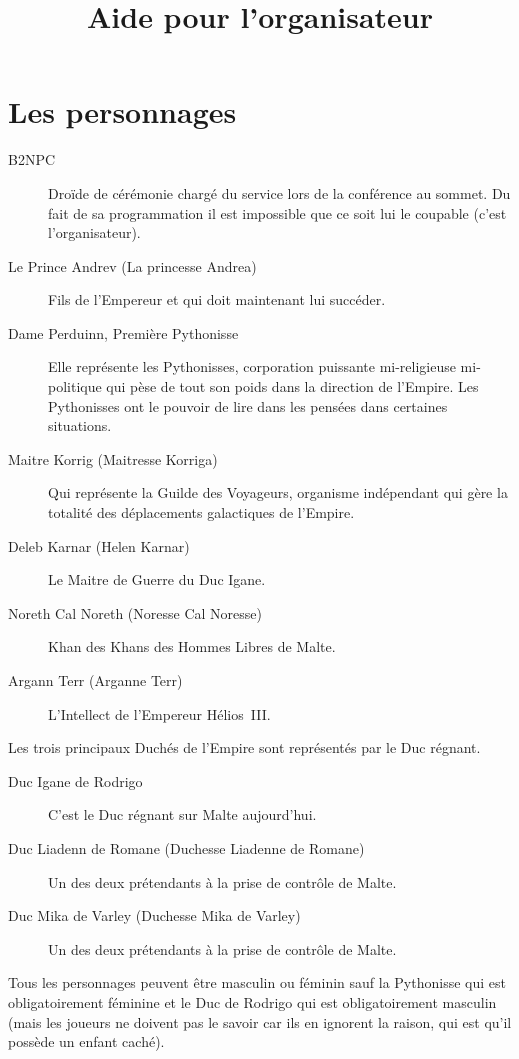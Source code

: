 \documentclass{article}
\title{Aide pour l'organisateur}
\date{}
\begin{document}
\maketitle

\section*{Les personnages}

\begin{description}
    \item[B2NPC] Droïde de cérémonie chargé du service lors de la conférence
        au sommet. Du fait de sa programmation il est impossible que ce soit
        lui le coupable (c'est l'organisateur).
    \item[Le Prince Andrev (La princesse Andrea)] Fils de l'Empereur et qui
        doit maintenant lui succéder.
    \item[Dame Perduinn, Première Pythonisse] Elle représente les Pythonisses,
        corporation puissante mi-religieuse mi-politique qui pèse de tout son
        poids dans la direction de l'Empire. Les Pythonisses ont le pouvoir de
        lire dans les pensées dans certaines situations.
    \item[Maitre Korrig (Maitresse Korriga)] Qui représente la Guilde des
        Voyageurs, organisme indépendant qui gère la totalité des déplacements
        galactiques de l'Empire.
    \item[Deleb Karnar (Helen Karnar)] Le Maitre de Guerre du Duc Igane.
    \item[Noreth Cal Noreth (Noresse Cal Noresse)] Khan des Khans des Hommes
        Libres de Malte.
    \item[Argann Terr (Arganne Terr)] L'Intellect de l'Empereur Hélios~III.
\end{description}
Les trois principaux Duchés de l'Empire sont représentés par le Duc régnant.
\begin{description}
    \item[Duc Igane de Rodrigo] C'est le Duc régnant sur Malte aujourd'hui.
    \item[Duc Liadenn de Romane (Duchesse Liadenne de Romane)] Un des deux
        prétendants à la prise de contrôle de Malte.
    \item[Duc Mika de Varley (Duchesse Mika de Varley)] Un des deux prétendants
        à la prise de contrôle de Malte.
\end{description}

Tous les personnages peuvent être masculin ou féminin sauf la Pythonisse qui
est obligatoirement féminine et le Duc de Rodrigo qui est obligatoirement
masculin (mais les joueurs ne doivent pas le savoir car ils en ignorent la
raison, qui est qu'il possède un enfant caché).
\end{document}
